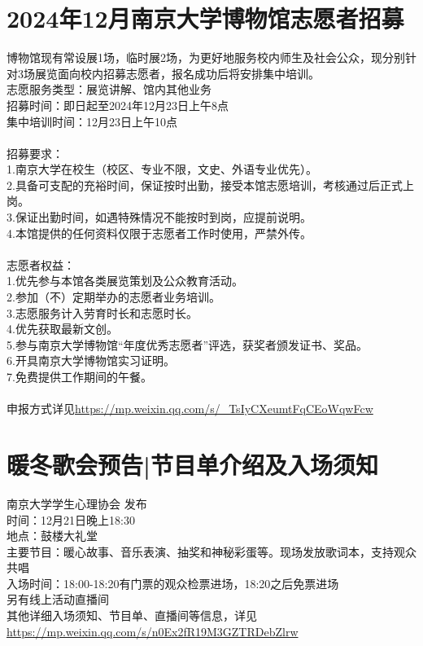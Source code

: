 \documentclass[letterpaper, 12pt]{article}
\begin{document}
\begin{multicols}{2}
\section{2024年12月南京大学博物馆志愿者招募}
博物馆现有常设展1场，临时展2场，为更好地服务校内师生及社会公众，现分别针对3场展览面向校内招募志愿者，报名成功后将安排集中培训。\\
志愿服务类型：展览讲解、馆内其他业务\\
招募时间：即日起至2024年12月23日上午8点\\
集中培训时间：12月23日上午10点\\\\
招募要求：\\
1.南京大学在校生（校区、专业不限，文史、外语专业优先）。\\
2.具备可支配的充裕时间，保证按时出勤，接受本馆志愿培训，考核通过后正式上岗。\\
3.保证出勤时间，如遇特殊情况不能按时到岗，应提前说明。\\
4.本馆提供的任何资料仅限于志愿者工作时使用，严禁外传。\\\\
志愿者权益：\\
1.优先参与本馆各类展览策划及公众教育活动。\\
2.参加（不）定期举办的志愿者业务培训。\\
3.志愿服务计入劳育时长和志愿时长。\\
4.优先获取最新文创。\\
5.参与南京大学博物馆“年度优秀志愿者”评选，获奖者颁发证书、奖品。\\
6.开具南京大学博物馆实习证明。\\
7.免费提供工作期间的午餐。\\\\
申报方式详见\url{https://mp.weixin.qq.com/s/_TsIyCXeumtFqCEoWqwFcw}
\section{暖冬歌会预告|节目单介绍及入场须知}
南京大学学生心理协会 发布\\
时间：12月21日晚上18:30\\
地点：鼓楼大礼堂\\
主要节目：暖心故事、音乐表演、抽奖和神秘彩蛋等。现场发放歌词本，支持观众共唱\\
入场时间：18:00-18:20有门票的观众检票进场，18:20之后免票进场\\
另有线上活动直播间\\
其他详细入场须知、节目单、直播间等信息，详见\url{https://mp.weixin.qq.com/s/n0Ex2fR19M3GZTRDebZlrw}\\
\end{multicols} 
\end{document}
